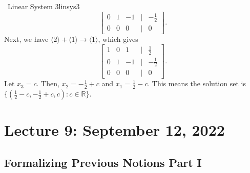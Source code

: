 \begin{example}{\Difficulty\,\Difficulty\,\,Linear System 3}{linsys3}
\begin{equation*}
\begin{bmatrix}
                 0 & 1 & -1 & | & -\frac{1}{2} \\
                 0 & 0 & 0 & | & 0
            \end{bmatrix}.
        \end{equation*}
        Next, we have \(\langle2\rangle+\langle1\rangle\to\langle1\rangle\), which gives
        \begin{equation*}
            \begin{bmatrix}
                 1 & 0 & 1 & | & \frac{1}{2} \\
                 0 & 1 & -1 & | & -\frac{1}{2} \\
                 0 & 0 & 0 & | & 0
            \end{bmatrix}.
        \end{equation*}
        Let \(x_3=c\). Then, \(x_2=-\frac{1}{2}+c\) and \(x_1=\frac{1}{2}-c\). This means the solution set is \(\{\left(\frac{1}{2}-c,-\frac{1}{2}+c,c\right):c\in\mathbb{R}\}\).
    \end{example}

\pagebreak

\section{Lecture 9: September 12, 2022}

    \subsection{Formalizing Previous Notions Part I}

